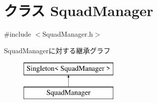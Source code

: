 \hypertarget{class_squad_manager}{\section{クラス Squad\-Manager}
\label{class_squad_manager}
}


{\ttfamily \#include $<$Squad\-Manager.\-h$>$}

Squad\-Managerに対する継承グラフ\begin{figure}[H]
\begin{center}
\leavevmode
\includegraphics[height=2.000000cm]{df/dc1/class_squad_manager}
\end{center}
\end{figure}
